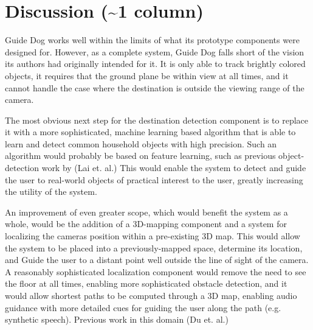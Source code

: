 \section{Discussion (\textasciitilde 1 column)}
\label{sec:discussion}

Guide Dog works well within the limits of what its prototype components were
designed for. However, as a complete system, Guide Dog falls short of the 
vision its authors had originally intended for it. It is only able to track
brightly colored objects, it requires that the ground plane be within view
at all times, and it cannot handle the case where the destination is outside
the viewing range of the camera. 

The most obvious next step for the destination detection component is to
replace it with a more sophisticated, machine learning based algorithm that
is able to learn and detect common household objects with high precision.
Such an algorithm would probably be based on feature learning, such as
previous object-detection work by (Lai et. al.)
This would enable the system to detect and guide the user to real-world
objects of practical interest to the user, greatly increasing the
utility of the system.

An improvement of even greater scope, which would benefit the system as
a whole, would be the addition of a 3D-mapping component and a system
for localizing the cameras position within a pre-existing 3D map. This
would allow the system to be placed into a previously-mapped space,
determine its location, and Guide the user to a distant point well
outside the line of sight of the camera. A reasonably sophisticated 
localization component would remove the need to see the floor at all
times, enabling more sophisticated obstacle detection, and it would 
allow shortest paths to be computed through a 3D map, enabling audio
guidance with more detailed cues for guiding the user along the path
(e.g. synthetic speech). Previous work in this domain (Du et. al.)



